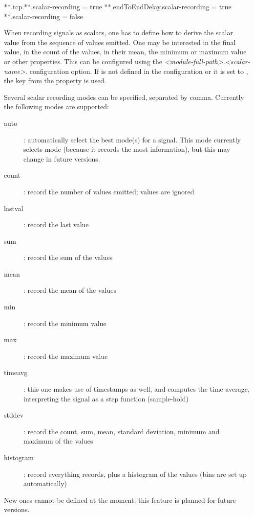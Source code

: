\begin{inifile}
**.tcp.**.scalar-recording = true
**.endToEndDelay.scalar-recording = true
**.scalar-recording = false
\end{inifile}


When recording signals as scalars, one has to define how to derive the
scalar value from the sequence of values emitted. One may be interested
in the final value, in the count of the values, in their mean, the minimum
or maximum value or other properties. This can be configured using the
\textit{<module-full-path>.<scalar-name>.}
configuration option. If  is not defined
in the configuration or it is set to , the  key
from the  property is used.

Several scalar recording modes can be specified, separated by comma.
Currently the following modes are supported:

\begin{description}
  \item[auto]: automatically select the best mode(s) for a signal. This mode
      currently selects  mode (because it records the most
      information), but this may change in future versions.
  \item[count]: record the number of values emitted; values are ignored
  \item[lastval]: record the last value
  \item[sum]: record the sum of the values
  \item[mean]: record the mean of the values
  \item[min]: record the minimum value
  \item[max]: record the maximum value
  \item[timeavg]: this one makes use of timestamps as well, and computes the
      time average, interpreting the signal as a step function (sample-hold)
  \item[stddev]: record the count, sum, mean, standard deviation, minimum
      and maximum of the values
  \item[histogram]: record everything  records, plus a histogram
      of the values (bins are set up automatically)
\end{description}

New ones cannot be defined at the moment; this feature is planned for future versions.

